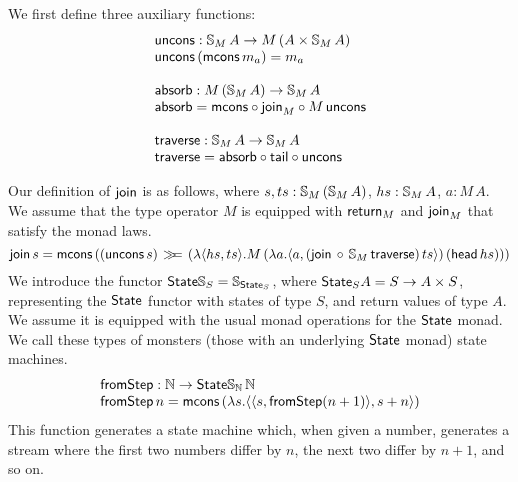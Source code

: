 We first define three auxiliary functions:
$$
\begin{array}{l}
\mathsf{uncons} : \mathbb{S}_{M}\,A \rightarrow M\,(A \times \mathbb{S}_{M}\,A)\\
\mathsf{uncons}\, (\mathsf{mcons}\, m_a) = m_a \\
\,\\
\mathsf{absorb} : M\,(\mathbb{S}_{M}\,A) \rightarrow \mathbb{S}_{M}\,A \\
\mathsf{absorb} =  \mathsf{mcons} \circ \mathsf{join}_{M} \circ M\,\mathsf{uncons} \\
\,\\
\mathsf{traverse} : \mathbb{S}_{M}\,A \rightarrow \mathbb{S}_{M}\,A \\
\mathsf{traverse} = \mathsf{absorb} \circ \mathsf{tail} \circ \mathsf{uncons}
\end{array}
$$

Our definition of $\mathsf{join}$ is as follows, where $s, ts : \mathbb{S}_{M}\,(\mathbb{S}_{M}\, A)$, 
$hs : \mathbb{S}_{M}\, A$, $a : M\, A$. We assume that the type operator $M$ is equipped with $\mathsf{return}_M$ and $\mathsf{join}_M$ that satisfy the monad laws.
$$
\mathsf{join}\, s = \mathsf{mcons}\, ((\mathsf{uncons}\, s) \, \mathbin{\gg\!\!=} \,(\lambda \langle hs, ts \rangle . M\,(\lambda a . \langle a, (\mathsf{join}\, \circ\, \mathbb{S}_{M}\,\mathsf{traverse})\, ts \rangle)\, (\mathsf{head}\, hs)))
$$
We introduce the functor $\mathsf{State}\mathbb{S}_{S} = \mathbb{S}_{\mathsf{State}_S}$, where $\mathsf{State}_S A = S \rightarrow A \times S$, representing the $\mathsf{State}$ functor with states of type $S$, and return values of type $A$. We assume it is equipped with the usual monad operations for the $\mathsf{State}$ monad. We call these types of monsters (those with an underlying $\mathsf{State}$ monad) state machines.
$$
\begin{array}{l}
\mathsf{fromStep} : \mathbb{N} \rightarrow \mathsf{State}\mathbb{S}_{\mathbb{N}}\,\mathbb{N} \\
\mathsf{fromStep}\, n = \mathsf{mcons}\, (\lambda s. \langle \langle s, \mathsf{fromStep} (n + 1) \rangle, s + n \rangle)
\end{array}
$$
This function generates a state machine which, when given a number, generates a stream where the first two numbers differ by $n$, the next two differ by $n + 1$, and so on.

